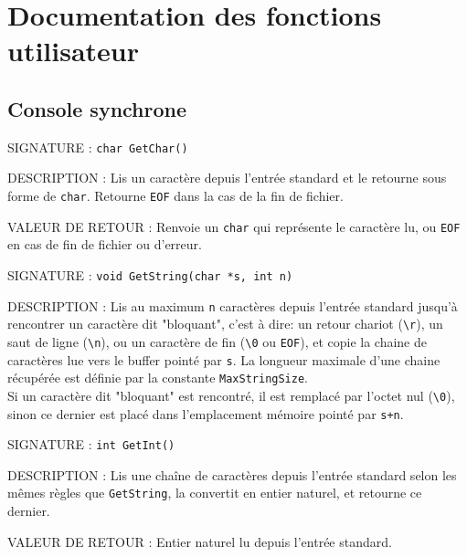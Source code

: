 \documentclass{article}
\begin{document}
\section{Documentation des fonctions utilisateur}
	\subsection{Console synchrone}
		\begin{description}
			\item{SIGNATURE : } \texttt{char GetChar()}
			\item{DESCRIPTION :}{ Lis un caractère depuis l'entrée standard et le retourne sous forme de \texttt{char}. Retourne \texttt{EOF} dans la cas de la fin de fichier.}
			\item{VALEUR DE RETOUR : } Renvoie un \texttt{char} qui représente le caractère lu, ou \texttt{EOF} en cas de fin de fichier ou d'erreur.
		\end{description}
		\vspace{2.5mm}
		\begin{description}
			\item{SIGNATURE : } \texttt{void GetString(char *s, int n)}
			\item{DESCRIPTION : } Lis au maximum \texttt{n} caractères depuis l'entrée standard jusqu'à rencontrer un caractère dit "bloquant", c'est à dire: un retour chariot (\texttt{\textbackslash{}r}), un saut de ligne (\texttt{\textbackslash{}n}), ou un caractère de fin (\texttt{\textbackslash{}0} ou \texttt{EOF}), et copie la chaine de caractères lue vers le buffer pointé par \texttt{s}. La longueur maximale d'une chaine récupérée est définie par la constante \texttt{MaxStringSize}. \\Si un caractère dit "bloquant" est rencontré, il est remplacé par l'octet nul (\texttt{\textbackslash{}0}), sinon ce dernier est placé dans l'emplacement mémoire pointé par \texttt{s+n}.
		\end{description}
		\vspace{2.5mm}
		\begin{description}
			\item{SIGNATURE : } \texttt{int GetInt()}
			\item{DESCRIPTION : } Lis une chaîne de caractères depuis l'entrée standard selon les mêmes règles que \texttt{GetString}, la convertit en entier naturel, et retourne ce dernier.
			\item{VALEUR DE RETOUR : } Entier naturel lu depuis l'entrée standard.
		\end{description}
\end{document}
